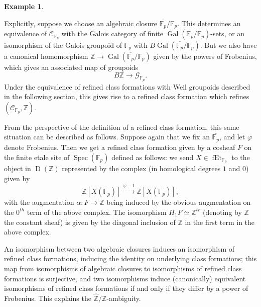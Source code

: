 \documentclass[12pt]{article}
\theoremstyle{definition}
\newtheorem{example}[theorem]{Example}
\newcommand{\on}{\operatorname}
\newcommand{\mc}{\mathcal}
\newcommand{\mbb}{\mathbb}
\newcommand{\wh}{\widehat}
\begin{document}
\begin{example}
\begin{enumerate}
Explicitly, suppose we choose an algebraic closure $\overline{\mbb{F}_p}/\mbb{F}_p$.  This determines an equivalence of $\mc{C}_{\mbb{F}_p}$ with the Galois category of finite $\on{Gal}(\overline{\mbb{F}_p}/\mbb{F}_p)$-sets, or an isomorphism of the Galois groupoid of $\mbb{F}_p$ with $B\on{Gal}(\overline{\mbb{F}_p}/\mbb{F}_p)$.  But we also have a canonical homomorphism $\mbb{Z} \to \on{Gal}(\overline{\mbb{F}_p}/\mbb{F}_p)$ given by the powers of Frobenius, which gives an associated map of groupoids
$$B\mbb{Z} \to \mc{G}_{\mbb{F}_p}.$$
Under the equivalence of refined class formations with Weil groupoids described in the following section, this gives rise to a refined class formation which refines $(\mc{C}_{\mbb{F}_p},\mbb{Z})$.

From the perspective of the definition of a refined class formation, this same situation can be described as follows.  Suppose again that we fix an $\overline{\mbb{F}_p}$, and let $\varphi$ denote Frobenius.  Then we get a refined class formation given by a cosheaf $F$ on the finite etale site of $\on{Spec}(\mbb{F}_p)$ defined as follows: we send $X\in \on{fEt}_{\mbb{F}_p}$ to the object in $\on{D}(\mbb{Z})$ represented by the complex (in homological degrees $1$ and $0$) given by
$$\mbb{Z}[X(\overline{\mbb{F}_p})] \overset{\varphi - 1}{\longrightarrow} \mbb{Z}[X(\overline{\mbb{F}_p})],$$
with the augmentation $\alpha:F\to\mbb{Z}$ being induced by the obvious augmentation on the $0^{th}$ term of the above complex.  The isomorphism $H_1F\simeq \mbb{Z}^{tr}$ (denoting by $\mbb{Z}$ the constant sheaf) is given by the diagonal inclusion of $\mbb{Z}$ in the first term in the above complex.

An isomorphism between two algebraic closures induces an isomorphism of refined class formations, inducing the identity on underlying class formations; this map from isomorphisms of algebraic closures to isomorphisms of refined class formations is surjective, and two isomorphisms induce (canonically) equivalent isomorphisms of refined class formations if and only if they differ by a power of Frobenius.  This explains the $\wh{\mbb{Z}}/\mbb{Z}$-ambiguity.


\end{enumerate}
\end{example}
\end{document}
